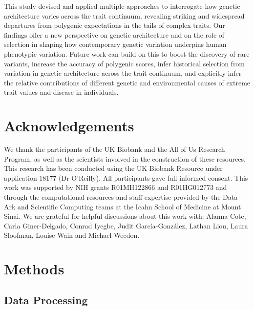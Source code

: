 \documentclass[12pt]{zHenriquesLab-StyleBioRxiv}
\begin{document}
This study devised and applied multiple approaches to interrogate how genetic architecture 
varies across the trait continuum, revealing striking and widespread departures from polygenic 
expectations in the tails of complex traits. Our findings offer a new perspective on 
genetic architecture and on the role of selection in shaping how contemporary genetic 
variation underpins human phenotypic variation. Future work can build on this to boost 
the discovery of rare variants, increase the accuracy of polygenic scores, infer historical 
selection from variation in genetic architecture across the trait continuum, 
and explicitly infer the relative contributions of different genetic and environmental 
causes of extreme trait values and disease in individuals.
%
%
%
%
%
%
%
%
%
%
%
%
%
%
%
%
%
%
%
%
%
%
%
%
%
%
%
%
%
%
%
%
%
%
%
%
%
%
%
%
%
%
%
%
\section*{Acknowledgements}
We thank the participants of the UK Biobank and the All of Us Research Program, as well as the scientists involved in
the construction of these resources. This research has been conducted using
the UK Biobank Resource under application 18177 (Dr O’Reilly). All participants gave full informed consent. This work was supported by NIH grants R01MH122866 and R01HG012773 and through the computational resources and staff expertise provided by the Data Ark and Scientific Computing teams at the Icahn School of Medicine at Mount Sinai. We are grateful for helpful discussions about this work with: Alanna Cote, Carla Giner-Delgado, Conrad Iyegbe, Judit García-González, Lathan Liou, Laura Sloofman, Louise Wain and Michael Weedon.


\clearpage \newpage 
\section*{Methods} \label{sec:methods} 
\subsection*{Data Processing} \label{sec:methods:dataProcessing}
\end{document}
